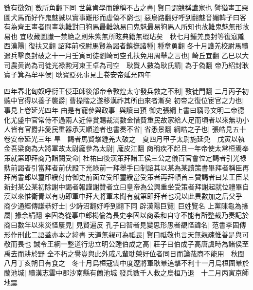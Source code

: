 數有徵効|{
	數所角翻下同}
世莫肯學而競稱不占之書|{
	賢曰謂競稱䜟家也}
譬猶畫工惡圖犬馬而好作鬼魅誠以實事難形而虚偽不窮也|{
	惡烏路翻好呼到翻魅音媚韓子曰客有為齊王畫者問畫孰難對曰狗馬最難孰易曰鬼魅最易狗馬人所知也故難鬼魅無形故易也}
宜收藏圖䜟一禁絶之則朱紫無所眩典籍無瑕玷矣　秋七月鍾羌良封等復寇隴西漢陽|{
	復扶又翻}
詔拜前校尉馬賢為謁者鎮撫諸種|{
	種章勇翻}
冬十月護羌校尉馬續遣兵擊良封破之十一月壬寅司徒劉崎司空孔扶免用周舉之言也|{
	崎丘宜翻}
乙巳以大司農黄尚為司徒光禄勲河東王卓為司空　耿䝿人數為耿氏請|{
	為于偽翻}
帝乃紹封耿寶子箕為牟平侯|{
	耿寶貶死事見上卷安帝延光四年}


四年春北匈奴呼衍王侵車師後部帝令敦煌太守發兵救之不利|{
	敦徒門翻}
二月丙子初聽中官得以養子襲爵|{
	曹操階之遂移漢祚其所由來者漸矣}
初帝之復位宦官之力也|{
	事見上卷延光四年}
由是有寵參與政事|{
	與讀曰預}
御史張綱上書曰竊尋文明二帝德化尤盛中官常侍不過兩人近倖賞賜裁滿數金惜費重民故家給人足而頃者以來無功小人皆有官爵非愛民重器承天順道者也書奏不省|{
	省悉景翻}
綱皓之子也|{
	張皓見五十卷安帝延光三年}
旱　謁者馬賢擊鍾羌大破之　夏四月甲子太尉施延免　戊寅以執金吾梁商為大將軍故太尉龐參為太尉|{
	龐皮江翻}
商稱疾不起且一年帝使太常桓焉奉策就第即拜商乃詣闕受命|{
	杜祐曰後漢策拜諸王侯三公之儀百官會位定謁者引光禄勲前謁者引當拜者前伏殿下光祿前一拜舉手曰制詔其以某為某讀策書畢拜者稱臣再拜尚書郎以璽印綬付侍御史前面立受印璽綬當受策者再拜頓首三贊謁者曰某王臣某新封某公某初除謝中謁者報謹謝贊者立曰皇帝為公興重坐受策者拜謝起就位禮畢自漢以來惟衛青以有功即軍中拜大將軍未聞有就第即拜者也况以此異數加之后父乎}
商少通經傳謙恭好士|{
	少詩沼翻好呼到翻下同}
辟漢陽巨覽|{
	巨姓覽名}
上黨陳龜為掾屬|{
	掾余絹翻}
李固為從事中郎楊倫為長史李固以商柔和自守不能有所整裁乃奏記於商曰數年以來災怪屢見|{
	見賢遍反}
孔子曰智者見變思形愚者覩怪諱名|{
	范書李固傳形作刑此二語蓋亦本之緯書}
天道無親可為祗畏|{
	賢曰祗敬也言天無親疎惟善是與可敬而畏也}
誠令王綱一整道行忠立明公踵伯成之高|{
	莊子曰伯成子高唐虞時為諸侯至禹去而耕於野}
全不朽之譽豈與此外戚凡輩耽榮好位者同日而論哉商不能用　秋閏八月丁亥朔日有食之　冬十月烏桓寇雲中度遼將軍耿曅追擊不利十一月烏桓圍曅於蘭池城|{
	續漢志雲中郡沙南縣有蘭池城}
發兵數千人救之烏桓乃退　十二月丙寅京師地震

